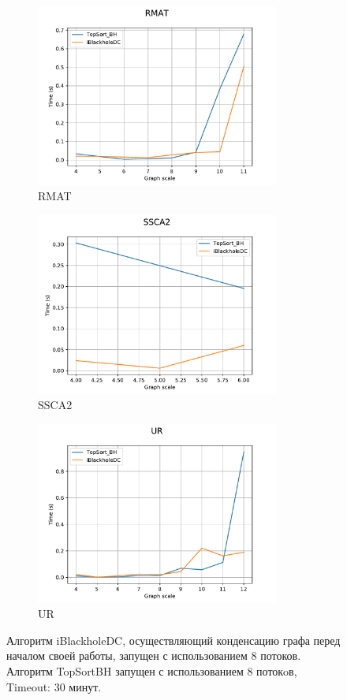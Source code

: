 \documentclass[12pt,a4paper,oneside,openany]{article}
\theoremstyle{definition}
\theoremstyle{lemma}
\theoremstyle{remark}
\begin{document}
\begin{figure}[H]
    \begin{subfigure}{.5\textwidth}
      \centering
      \includegraphics[width=8cm]{images/4_RMAT.pdf}
      \caption{RMAT}
      \label{fig:chinesecond:rmat}
    \end{subfigure}
    \begin{subfigure}{.5\textwidth}
      \centering
      \includegraphics[width=8cm]{images/4_SSCA2.pdf}
      \caption{SSCA2}
      \label{fig:chinesecond:ssca}
    \end{subfigure}
    \begin{subfigure}{.5\textwidth}
      \centering
      \includegraphics[width=8cm]{images/4_UR.pdf}
      \caption{UR}
      \label{fig:chinesecond:ur}
    \end{subfigure}
    \caption{Алгоритм iBlackholeDC, осуществляющий конденсацию графа перед началом своей работы,
запущен с использованием 8 потоков. Алгоритм TopSortBH запущен с использованием 8 потокoв, Timeout: 30 минут.}
    \label{fig:chinesecond}
\end{figure}
\end{document}
